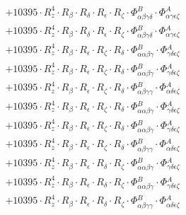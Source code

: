 \documentclass{article}
\begin{document}
\begin{subequations}
\begin{gather}
\begin{array}{c}
 \\[0.2em] 		 + 10395 \cdot R_{z}^{4} \cdot R_{\beta{}} \cdot R_{\delta{}} \cdot R_{\epsilon{}} \cdot R_{\zeta{}} \cdot \Phi{}^{B}_{\alpha{}\beta{}\gamma{}\delta{}} \cdot \Phi{}^{A}_{\alpha{}\gamma{}\epsilon{}\zeta{}} 
 \\[0.2em] 		 + 10395 \cdot R_{z}^{4} \cdot R_{\beta{}} \cdot R_{\delta{}} \cdot R_{\epsilon{}} \cdot R_{\zeta{}} \cdot \Phi{}^{B}_{\alpha{}\beta{}\gamma{}\delta{}} \cdot \Phi{}^{A}_{\alpha{}\gamma{}\epsilon{}\zeta{}} 
 \\[0.2em] 		 + 10395 \cdot R_{z}^{4} \cdot R_{\beta{}} \cdot R_{\epsilon{}} \cdot R_{\zeta{}} \cdot R_{\delta{}} \cdot \Phi{}^{B}_{\alpha{}\alpha{}\beta{}\gamma{}} \cdot \Phi{}^{A}_{\gamma{}\delta{}\epsilon{}\zeta{}} 
 \\[0.2em] 		 + 10395 \cdot R_{z}^{4} \cdot R_{\beta{}} \cdot R_{\epsilon{}} \cdot R_{\zeta{}} \cdot R_{\delta{}} \cdot \Phi{}^{B}_{\alpha{}\alpha{}\beta{}\gamma{}} \cdot \Phi{}^{A}_{\gamma{}\delta{}\epsilon{}\zeta{}} 
 \\[0.2em] 		 + 10395 \cdot R_{z}^{4} \cdot R_{\beta{}} \cdot R_{\epsilon{}} \cdot R_{\zeta{}} \cdot R_{\delta{}} \cdot \Phi{}^{B}_{\alpha{}\beta{}\gamma{}\gamma{}} \cdot \Phi{}^{A}_{\alpha{}\delta{}\epsilon{}\zeta{}} 
 \\[0.2em] 		 + 10395 \cdot R_{z}^{4} \cdot R_{\beta{}} \cdot R_{\epsilon{}} \cdot R_{\zeta{}} \cdot R_{\delta{}} \cdot \Phi{}^{B}_{\alpha{}\alpha{}\beta{}\gamma{}} \cdot \Phi{}^{A}_{\gamma{}\delta{}\epsilon{}\zeta{}} 
 \\[0.2em] 		 + 10395 \cdot R_{z}^{4} \cdot R_{\beta{}} \cdot R_{\epsilon{}} \cdot R_{\zeta{}} \cdot R_{\delta{}} \cdot \Phi{}^{B}_{\alpha{}\alpha{}\beta{}\gamma{}} \cdot \Phi{}^{A}_{\gamma{}\delta{}\epsilon{}\zeta{}} 
 \\[0.2em] 		 + 10395 \cdot R_{z}^{4} \cdot R_{\beta{}} \cdot R_{\epsilon{}} \cdot R_{\zeta{}} \cdot R_{\delta{}} \cdot \Phi{}^{B}_{\alpha{}\beta{}\gamma{}\gamma{}} \cdot \Phi{}^{A}_{\alpha{}\delta{}\epsilon{}\zeta{}} 
 \\[0.2em] 		 + 10395 \cdot R_{z}^{4} \cdot R_{\beta{}} \cdot R_{\epsilon{}} \cdot R_{\delta{}} \cdot R_{\zeta{}} \cdot \Phi{}^{B}_{\alpha{}\alpha{}\beta{}\gamma{}} \cdot \Phi{}^{A}_{\gamma{}\delta{}\epsilon{}\zeta{}} 
 \\[0.2em] 		 + 10395 \cdot R_{z}^{4} \cdot R_{\beta{}} \cdot R_{\epsilon{}} \cdot R_{\delta{}} \cdot R_{\zeta{}} \cdot \Phi{}^{B}_{\alpha{}\alpha{}\beta{}\gamma{}} \cdot \Phi{}^{A}_{\gamma{}\delta{}\epsilon{}\zeta{}} 
 \\[0.2em] 		 + 10395 \cdot R_{z}^{4} \cdot R_{\beta{}} \cdot R_{\epsilon{}} \cdot R_{\delta{}} \cdot R_{\zeta{}} \cdot \Phi{}^{B}_{\alpha{}\beta{}\gamma{}\gamma{}} \cdot \Phi{}^{A}_{\alpha{}\delta{}\epsilon{}\zeta{}} 

\end{array}
\end{gather}
\end{subequations}
\end{document}
